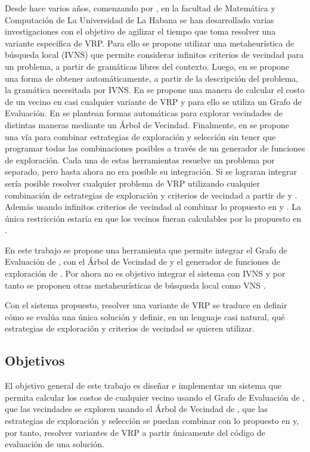 Desde hace varios años, comenzando por \cite{Camila}, en la facultad de Matemática y Computación de La Universidad de La Habana se han desarrollado varias investigaciones con el objetivo de agilizar el tiempo que toma resolver una variante específica de VRP. Para ello se propone utilizar una metaheurística de búsqueda local (IVNS) que permite considerar infinitos criterios de vecindad para un problema, a partir de gramáticas libres del contexto. Luego, en \cite{Daniela} se propone una forma de obtener automáticamente, a partir de la descripción del problema, la gramática necesitada por IVNS. En \cite{JJ} se propone una manera de calcular el costo de un vecino en casi cualquier variante de VRP y para ello se utiliza un Grafo de Evaluación. En \cite{Hector} se plantean formas automáticas para explorar vecindades de distintas maneras mediante un Árbol de Vecindad. Finalmente, en \cite{Heidy} se propone una vía para combinar estrategias de exploración y selección sin tener que programar todas las combinaciones posibles a través de un generador de funciones de exploración. Cada una de estas herramientas resuelve un problema por separado, pero hasta ahora no era posible su integración. Si se lograran integrar sería posible resolver cualquier problema de VRP utilizando cualquier combinación de estrategias de exploración y criterios de vecindad a partir de \cite{Hector} y \cite{Hector}. Además usando infinitos criterios de vecindad al combinar lo propuesto en \cite{Camila} y \cite{Daniela}. La única restricción estaría en que los vecinos fueran calculables por lo propuesto en \cite{JJ}.

En este trabajo se propone una herramienta que permite integrar el Grafo de Evaluación de \cite{JJ}, con el Árbol de Vecindad de \cite{Hector} y el generador de funciones de exploración de \cite{Heidy}. Por ahora no es objetivo integrar el sistema con IVNS y por tanto se proponen otras metaheurísticas de búsqueda local como VNS \cite{Vns-Component-2013,Amous-2017}.

Con el sistema propuesto, resolver una variante de VRP se traduce en definir cómo se evalúa una única solución y definir, en un lenguaje casi natural, qué estrategias de exploración y criterios de vecindad se quieren utilizar.

\subsection*{Objetivos}
El objetivo general de este trabajo es diseñar e implementar un sistema que permita calcular los costos de cualquier vecino usando el Grafo de Evaluación de \cite{JJ}, que las vecindades se exploren usando el Árbol de Vecindad de \cite{Hector}, que las estrategias de exploración y selección se puedan combinar con lo propuesto en \cite{Heidy} y, por tanto, resolver variantes de VRP a partir únicamente del código de evaluación de una solución.

